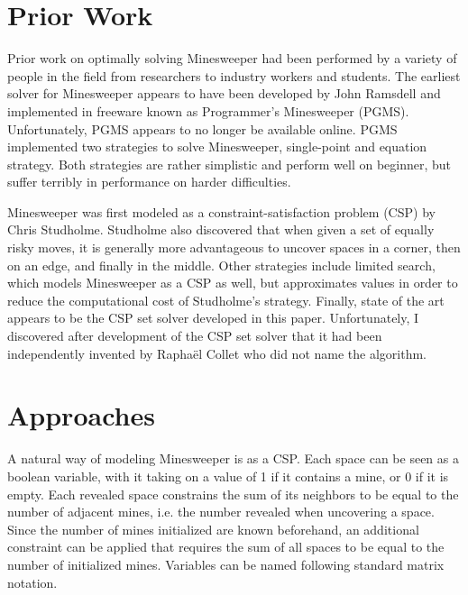 \documentclass[letterpaper]{article}
\begin{document}
\section{Prior Work}
Prior work on optimally solving Minesweeper had been performed by a variety of people in the field from researchers to industry workers and students.  The earliest solver for Minesweeper appears to have been developed by John Ramsdell and implemented in freeware known as Programmer's Minesweeper (PGMS).  Unfortunately, PGMS appears to no longer be available online.  PGMS implemented two strategies to solve Minesweeper, single-point and equation strategy.  Both strategies are rather simplistic and perform well on beginner, but suffer terribly in performance on harder difficulties.

Minesweeper was first modeled as a constraint-satisfaction problem (CSP) by Chris Studholme.  Studholme also discovered that when given a set of equally risky moves, it is generally more advantageous to uncover spaces in a corner, then on an edge, and finally in the middle.  Other strategies include limited search, which models Minesweeper as a CSP as well, but approximates values in order to reduce the computational cost of Studholme's strategy.  Finally, state of the art appears to be the CSP set solver developed in this paper.  Unfortunately, I discovered after development of the CSP set solver that it had been independently invented by Rapha\"el Collet who did not name the algorithm.

\section{Approaches}
A natural way of modeling Minesweeper is as a CSP.  Each space can be seen as a boolean variable, with it taking on a value of 1 if it contains a mine, or 0 if it is empty.  Each revealed space constrains the sum of its neighbors to be equal to the number of adjacent mines, i.e. the number revealed when uncovering a space.  Since the number of mines initialized are known beforehand, an additional constraint can be applied that requires the sum of all spaces to be equal to the number of initialized mines.  Variables can be named following standard matrix notation.
\end{document}
